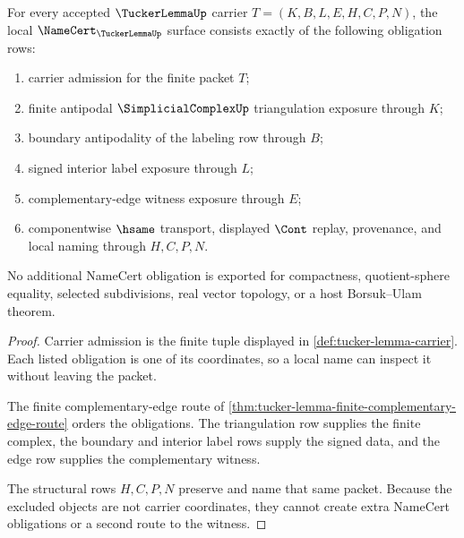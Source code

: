\begin{theorem}
\label{thm:tucker-lemma-namecert-obligations}
For every accepted $\TuckerLemmaUp$ carrier $T=(K,B,L,E,H,C,P,N)$, the local $\NameCert_{\TuckerLemmaUp}$ surface consists exactly of the following obligation rows:
\begin{enumerate}
\item carrier admission for the finite packet $T$;
\item finite antipodal $\SimplicialComplexUp$ triangulation exposure through $K$;
\item boundary antipodality of the labeling row through $B$;
\item signed interior label exposure through $L$;
\item complementary-edge witness exposure through $E$;
\item componentwise $\hsame$ transport, displayed $\Cont$ replay, provenance, and local naming through $H,C,P,N$.
\end{enumerate}
No additional NameCert obligation is exported for compactness, quotient-sphere equality, selected subdivisions, real vector topology, or a host Borsuk--Ulam theorem.
\end{theorem}
\begin{proof}
Carrier admission is the finite tuple displayed in \autoref{def:tucker-lemma-carrier}. Each listed obligation is one of its coordinates, so a local name can inspect it without leaving the packet.

The finite complementary-edge route of \autoref{thm:tucker-lemma-finite-complementary-edge-route} orders the obligations. The triangulation row supplies the finite complex, the boundary and interior label rows supply the signed data, and the edge row supplies the complementary witness.

The structural rows $H,C,P,N$ preserve and name that same packet. Because the excluded objects are not carrier coordinates, they cannot create extra NameCert obligations or a second route to the witness.
\end{proof}



